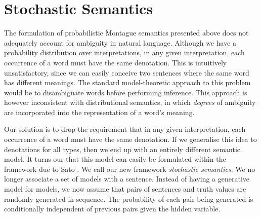 \documentclass[11pt]{article}
\theoremstyle{definition}
\begin{document}
\section{Stochastic Semantics}

The formulation of probabilistic Montague semantics presented above does not
adequately account for ambiguity in natural language. Although we have
a probability distribution over interpretations, in any given
interpretation, each occurrence of a word must have the same
denotation. This is intuitively unsatisfactory, since we can easily
conceive two sentences where the same word has different meanings. The
standard model-theoretic approach to this problem would be to
disambiguate words before performing inference. This approach is
however inconsistent with
distributional  semantics, in which \emph{degrees} of
ambiguity are incorporated into the representation of a word's
meaning.

Our solution is to drop the requirement that in any given interpretation, each occurrence of a word must
have the same denotation. If we generalise this idea to denotations
for all types, then we end up with an entirely different semantic
model. It turns our that this model can easily be formulated within the framework due to Sato
\cite{Sato:97}. We call our new framework \emph{stochastic semantics}. We no longer
associate a set of models with a sentence. Instead of having a
generative model for models, we now assume that pairs of sentences and
truth values are randomly generated in sequence. The probability of
each pair being generated is conditionally independent of previous
pairs given the hidden variable.

\end{document}
